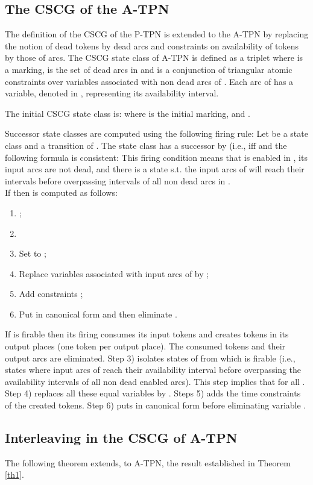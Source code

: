 \documentclass[submission,copyright,creativecommons]{eptcs}
\numberwithin{equation}{section}
\begin{document}
\subsection{The CSCG of the A-TPN}
The definition of the CSCG of the P-TPN is extended to the A-TPN by replacing the notion of dead tokens by dead arcs and constraints on availability of tokens by those of arcs. The CSCG state class of A-TPN is defined as a triplet  where  is a marking,  is the set of dead arcs in  and  is a conjunction of triangular atomic constraints over variables associated with non dead arcs of . Each arc  of
 has a variable, denoted  in , representing
its availability interval.
\par \indent The initial CSCG state class is:  where  is the initial marking,  and .
\par Successor state classes are computed using the following firing rule:
Let  be a state class and  a transition of . The state
class  has a successor by  (i.e.,
 iff
  and the following formula is
 consistent: 
This firing condition means that  is enabled in , its input arcs are not dead, and there is a state s.t. the input arcs  of  will reach their intervals before overpassing intervals of all non dead arcs in . \\
If  then  is  computed as follows:\begin{enumerate} \item ;
 \item 
 \item Set  to ;\item Replace variables  associated with input arcs of  by ; \item Add constraints ;
\item Put  in canonical form and then eliminate  .
\end{enumerate}
\noindent If  is firable then its firing consumes its input tokens and creates tokens in its output places (one token per output place). The consumed tokens and their output arcs are eliminated. Step 3) isolates states of  from which  is firable (i.e., states where input arcs of  reach their availability interval before overpassing the availability intervals of all non dead enabled arcs). This step implies that for all . Step 4) replaces all these equal variables by .  Steps 5) adds the time constraints of the created tokens. Step 6) puts  in canonical form before eliminating variable .
\subsection{Interleaving in the CSCG of A-TPN}
The following theorem extends, to A-TPN, the result established in Theorem \ref{th1}.
\end{document}
